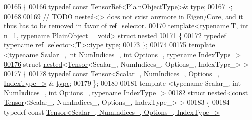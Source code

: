 \begin{DoxyCode}
00165 \{
00166   \textcolor{keyword}{typedef} \textcolor{keyword}{const} \hyperlink{class_eigen_1_1_tensor_ref}{TensorRef<PlainObjectType>}& \hyperlink{class_eigen_1_1_tensor_ref}{type};
00167 \};
00168 
00169 \textcolor{comment}{// TODO nested<> does not exist anymore in Eigen/Core, and it thus has to be removed in favor of
       ref\_selector.}
\hyperlink{struct_eigen_1_1internal_1_1nested}{00170} \textcolor{keyword}{template}<\textcolor{keyword}{typename} T, \textcolor{keywordtype}{int} n=1, \textcolor{keyword}{typename} PlainObject = \textcolor{keywordtype}{void}> \textcolor{keyword}{struct }\hyperlink{struct_eigen_1_1internal_1_1nested}{nested}
00171 \{
00172   \textcolor{keyword}{typedef} \textcolor{keyword}{typename} \hyperlink{class_eigen_1_1internal_1_1_tensor_lazy_evaluator_writable}{ref\_selector<T>::type} \hyperlink{class_eigen_1_1internal_1_1_tensor_lazy_evaluator_writable}{type};
00173 \};
00174 
00175 \textcolor{keyword}{template} <\textcolor{keyword}{typename} Scalar\_, \textcolor{keywordtype}{int} NumIndices\_, \textcolor{keywordtype}{int} Options\_, \textcolor{keyword}{typename} IndexType\_>
\hyperlink{struct_eigen_1_1internal_1_1nested_3_01_tensor_3_01_scalar___00_01_num_indices___00_01_options___00_01_index_type___01_4_01_4}{00176} \textcolor{keyword}{struct }\hyperlink{struct_eigen_1_1internal_1_1nested}{nested}<\hyperlink{class_eigen_1_1_tensor}{Tensor}<Scalar\_, NumIndices\_, Options\_, IndexType\_> >
00177 \{
00178   \textcolor{keyword}{typedef} \textcolor{keyword}{const} \hyperlink{class_eigen_1_1_tensor}{Tensor<Scalar\_, NumIndices\_, Options\_, IndexType\_>}
      & \hyperlink{class_eigen_1_1_tensor}{type};
00179 \};
00180 
00181 \textcolor{keyword}{template} <\textcolor{keyword}{typename} Scalar\_, \textcolor{keywordtype}{int} NumIndices\_, \textcolor{keywordtype}{int} Options\_, \textcolor{keyword}{typename} IndexType\_>
\hyperlink{struct_eigen_1_1internal_1_1nested_3_01const_01_tensor_3_01_scalar___00_01_num_indices___00_01_o921ff0e47aa2123e7e0ef990f080072a}{00182} \textcolor{keyword}{struct }\hyperlink{struct_eigen_1_1internal_1_1nested}{nested}<const \hyperlink{class_eigen_1_1_tensor}{Tensor}<Scalar\_, NumIndices\_, Options\_, IndexType\_> >
00183 \{
00184   \textcolor{keyword}{typedef} \textcolor{keyword}{const} \hyperlink{class_eigen_1_1_tensor}{Tensor<Scalar\_, NumIndices\_, Options\_, IndexType\_>}

\end{DoxyCode}
